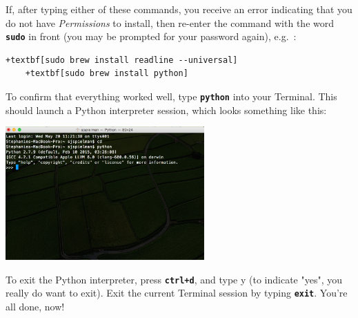 \documentclass{article}
\begin{document}
\begin{enumerate}
	If, after typing either of these commands, you receive an error indicating that you do not have \emph{Permissions} to install, then re-enter the command with the word \textbf{\texttt{sudo}} in front (you may be prompted for your password again), e.g.\ :
	\begin{Verbatim}[fontsize=\small,xleftmargin=-0.95cm,commandchars=+\[\]]
	+textbf[sudo brew install readline --universal]
	+textbf[sudo brew install python]
	\end{Verbatim}
	
%	

\end{enumerate}

\noindent To confirm that everything worked well, type \textbf{\texttt{python}} into your Terminal. This should launch a Python interpreter session, which looks something like this:

\begin{center}
	\includegraphics[width=3in]{python_session.png}
\end{center}	


To exit the Python interpreter, press \textbf{\texttt{ctrl+d}}, and type y (to indicate "yes", you really do want to exit). Exit the current Terminal session by typing \textbf{\texttt{exit}}. You're all done, now!
\end{document}
